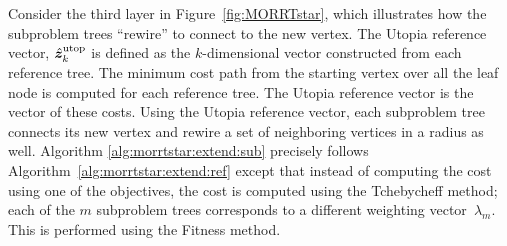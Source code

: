 \documentclass{article}
\begin{document}

Consider the third layer in Figure~\ref{fig:MORRTstar}, which illustrates how the subproblem trees ``rewire'' to connect to the new vertex.  
The Utopia reference vector, $ \hat{\bm{z}}_{k}^{\rm utop} $ is defined as the $k$-dimensional vector constructed from each reference tree.  
The minimum cost path from the starting vertex over all the leaf node is  computed for each reference tree.  
The Utopia reference vector is the vector of these costs. 
Using the Utopia reference vector, each subproblem tree connects its new vertex and rewire a set of neighboring vertices in a radius as well. 
Algorithm \ref{alg:morrtstar:extend:sub} precisely follows Algorithm~\ref{alg:morrtstar:extend:ref} except that instead of computing the cost using one of the objectives, the cost is computed using the Tchebycheff method; each of the $m$ subproblem trees corresponds to a different weighting vector~$\lambda_m$.  
This is performed using the {\sc Fitness} method.
\end{document}
